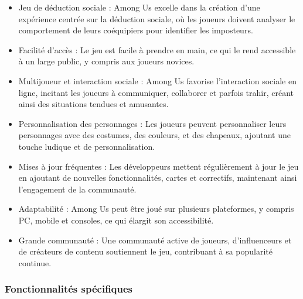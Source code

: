 \documentclass[
	article,			%
	11pt,				%
	oneside,			%
	a4paper,			%
	chapter=TITLE,
	french,			%
	sumario=tradicional
	]{base_nt}
\begin{document}
\begin{itemize}
    \item Jeu de déduction sociale : Among Us excelle dans la création d'une expérience centrée sur la déduction sociale, où les joueurs doivent analyser le comportement de leurs coéquipiers pour identifier les imposteurs.
    \item Facilité d'accès : Le jeu est facile à prendre en main, ce qui le rend accessible à un large public, y compris aux joueurs novices.
    \item Multijoueur et interaction sociale : Among Us favorise l'interaction sociale en ligne, incitant les joueurs à communiquer, collaborer et parfois trahir, créant ainsi des situations tendues et amusantes.
    \item Personnalisation des personnages : Les joueurs peuvent personnaliser leurs personnages avec des costumes, des couleurs, et des chapeaux, ajoutant une touche ludique et de personnalisation.
    \item Mises à jour fréquentes : Les développeurs mettent régulièrement à jour le jeu en ajoutant de nouvelles fonctionnalités, cartes et correctifs, maintenant ainsi l'engagement de la communauté.
    \item Adaptabilité : Among Us peut être joué sur plusieurs plateformes, y compris PC, mobile et consoles, ce qui élargit son accessibilité.
    \item Grande communauté : Une communauté active de joueurs, d'influenceurs et de créateurs de contenu soutiennent le jeu, contribuant à sa popularité continue.
\end{itemize}

\subsubsection{Fonctionnalités spécifiques}
\end{document}
